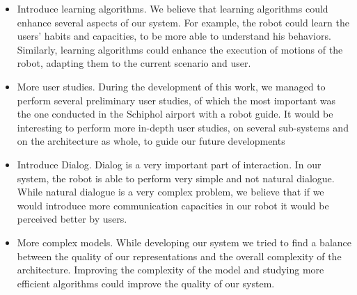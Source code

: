 \begin{itemize}
\item Introduce learning algorithms. We believe that learning algorithms could enhance several aspects of our system. For example, the robot could learn the users' habits and capacities, to be more able to understand his behaviors. Similarly, learning algorithms could enhance the execution of motions of the robot, adapting them to the current scenario and user.
\item More user studies. During the development of this work, we managed to perform several preliminary user studies, of which the most important was the one conducted in the Schiphol airport with a robot guide. It would be interesting to perform more in-depth user studies, on several sub-systems and on the architecture as whole, to guide our future developments 
\item Introduce Dialog. Dialog is a very important part of interaction. In our system, the robot is able to perform very simple and not natural dialogue. While natural dialogue is a very complex problem, we believe that if we would introduce more communication capacities in our robot it would be perceived better by users.
\item More complex models. While developing our system we tried to find a balance between the quality of our representations and the overall complexity  of the architecture. Improving the complexity of the model and studying more efficient algorithms could improve the quality of our system.
\end{itemize}
